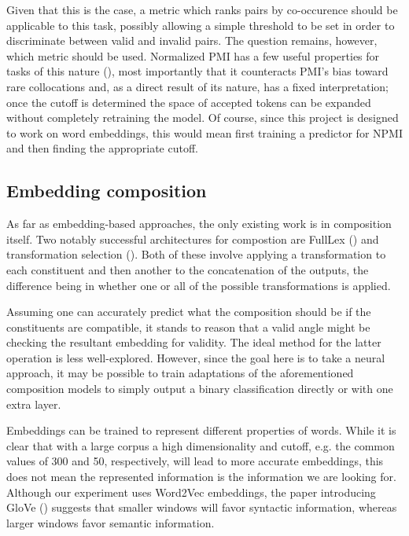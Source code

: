 \documentclass[a4paper, 12pt]{article}
\begin{document}
Given that this is the case, a metric which ranks pairs by co-occurence should be applicable to this task, possibly allowing a simple threshold to be set in order to discriminate between valid and invalid pairs. The question remains, however, which metric should be used. Normalized PMI has a few useful properties for tasks of this nature (\cite{BoumaNPMI}), most importantly that it counteracts PMI's bias toward rare collocations and, as a direct result of its nature, has a fixed interpretation; once the cutoff is determined the space of accepted tokens can be expanded without completely retraining the model. Of course, since this project is designed to work on word embeddings, this would mean first training a predictor for NPMI and then finding the appropriate cutoff.

\subsection{Embedding composition}

As far as embedding-based approaches, the only existing work is in composition itself. Two notably successful architectures for compostion are FullLex (\cite{SocherFullLex}) and transformation selection (\cite{TSelect}). Both of these involve applying a transformation to each constituent and then another to the concatenation of the outputs, the difference being in whether one or all of the possible transformations is applied.

Assuming one can accurately predict what the composition should be if the constituents are compatible, it stands to reason that a valid angle might be checking the resultant embedding for validity. The ideal method for the latter operation is less well-explored. However, since the goal here is to take a neural approach, it may be possible to train adaptations of the aforementioned composition models to simply output a binary classification directly or with one extra layer.

Embeddings can be trained to represent different properties of words. While it is clear that with a large corpus a high dimensionality and cutoff, e.g. the common values of 300 and 50, respectively, will lead to more accurate embeddings, this does not mean the represented information is the information we are looking for. Although our experiment uses Word2Vec embeddings, the paper introducing GloVe (\cite{PenningtonSocherManningGlove}) suggests that smaller windows will favor syntactic information, whereas larger windows favor semantic information.
\end{document}
